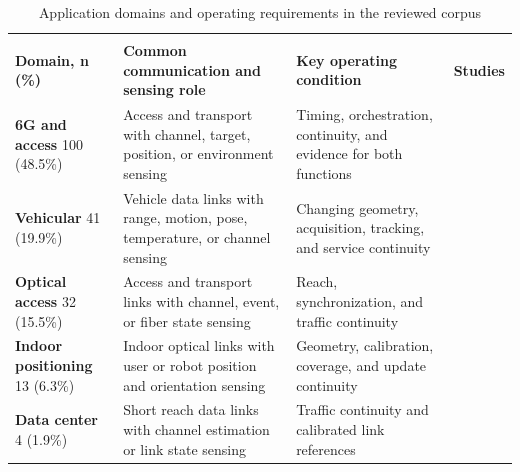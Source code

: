 \begin{table}[!t]
\caption{Application domains and operating requirements in the reviewed corpus}
\label{tab:application_requirements}
\centering
\footnotesize
\setlength{\tabcolsep}{3pt}
\renewcommand{\arraystretch}{1.05}
\begin{tabularx}{\textwidth}{@{}
>{\raggedright\arraybackslash}p{}
>{\raggedright\arraybackslash}p{}
>{\raggedright\arraybackslash}X
>{\centering\arraybackslash}p{}@{}}
\toprule
\multicolumn{4}{@{}l}{\emph{Network and mobility}} \\
\addlinespace[1pt]
\textbf{Domain, n (\%)} & \textbf{Common communication and sensing role} &
\textbf{Key operating condition} & \textbf{Studies} \\
\midrule
\textbf{6G and access} 100 (48.5\%) & Access and transport with channel, target,
position, or environment sensing & Timing, orchestration, continuity, and
evidence for both functions & \cite{OISAC_SCR00277,OISAC_SCR01049} \\
\addlinespace[1.25pt]
\textbf{Vehicular} 41 (19.9\%) & Vehicle data links with range, motion, pose,
temperature, or channel sensing & Changing geometry, acquisition, tracking, and
service continuity & \cite{OISAC_SCR00123,OISAC_SCR00273} \\
\addlinespace[1.25pt]
\textbf{Optical access} 32 (15.5\%) & Access and transport links with channel,
event, or fiber state sensing & Reach, synchronization, and traffic continuity &
\cite{OISAC_SCR00007,OISAC_SCR01006,OISAC_SCR01049} \\
\addlinespace[1.25pt]
\textbf{Indoor positioning} 13 (6.3\%) & Indoor optical links with user or robot
position and orientation sensing & Geometry, calibration, coverage, and update
continuity &
\cite{OISAC_SCR00910,OISAC_SCR01024} \\
\addlinespace[1.25pt]
\textbf{Data center} 4 (1.9\%) & Short reach data links with channel estimation
or link state sensing & Traffic continuity and calibrated link references &
\cite{OISAC_SCR00007} \\
\bottomrule
\end{tabularx}


\end{table}
